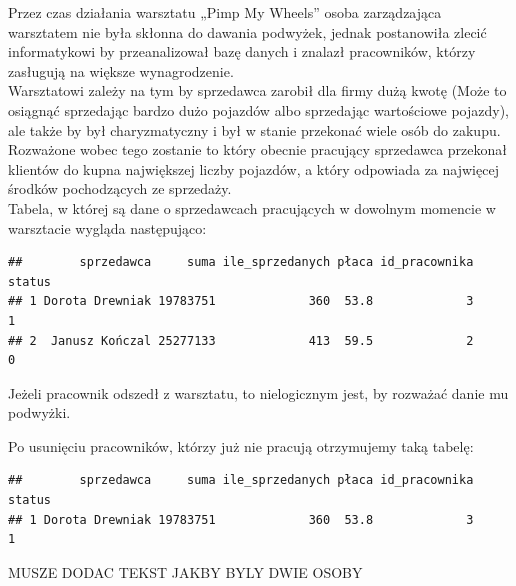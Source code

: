 \documentclass{article}\usepackage[]{graphicx}\usepackage[]{xcolor}
\makeatletter
\newenvironment{kframe}{%
 \def\at@end@of@kframe{}%
 \ifinner\ifhmode%
  \def\at@end@of@kframe{\end{minipage}}%
  \begin{minipage}{\columnwidth}%
 \fi\fi%
 \def\FrameCommand##1{\hskip\@totalleftmargin \hskip-\fboxsep
 \colorbox{shadecolor}{##1}\hskip-\fboxsep
     \hskip-\linewidth \hskip-\@totalleftmargin \hskip\columnwidth}%
 \MakeFramed {\advance\hsize-\width
   \@totalleftmargin\z@ \linewidth\hsize
   \@setminipage}}%
 {\par\unskip\endMakeFramed%
 \at@end@of@kframe}
\newenvironment{knitrout}{}{} %
\makeatother
\begin{document}
Przez czas działania warsztatu „Pimp My Wheels” osoba zarządzająca warsztatem nie była skłonna do dawania podwyżek, jednak postanowiła zlecić informatykowi by przeanalizował bazę danych i znalazł pracowników, którzy zasługują na większe wynagrodzenie. \\

Warsztatowi zależy na tym by sprzedawca zarobił dla firmy dużą kwotę (Może to osiągnąć sprzedając bardzo dużo pojazdów albo sprzedając wartościowe pojazdy), ale także by był charyzmatyczny i był w stanie przekonać wiele osób do zakupu. Rozważone wobec tego zostanie to który obecnie pracujący sprzedawca przekonał klientów do kupna największej liczby pojazdów, a który odpowiada za najwięcej środków pochodzących ze sprzedaży. \\


Tabela, w której są dane o sprzedawcach  pracujących w dowolnym momencie w warsztacie wygląda następująco:

\begin{knitrout}
\color{fgcolor}\begin{kframe}
\begin{verbatim}
##        sprzedawca     suma ile_sprzedanych płaca id_pracownika status
## 1 Dorota Drewniak 19783751             360  53.8             3      1
## 2  Janusz Kończal 25277133             413  59.5             2      0
\end{verbatim}
\end{kframe}
\end{knitrout}

Jeżeli pracownik odszedł z warsztatu, to nielogicznym jest, by rozważać danie mu podwyżki.

Po usunięciu pracowników, którzy już nie pracują otrzymujemy taką tabelę:

\begin{knitrout}
\color{fgcolor}\begin{kframe}
\begin{verbatim}
##        sprzedawca     suma ile_sprzedanych płaca id_pracownika status
## 1 Dorota Drewniak 19783751             360  53.8             3      1
\end{verbatim}
\end{kframe}
\end{knitrout}

MUSZE DODAC TEKST JAKBY BYLY DWIE OSOBY \\
\end{document}
